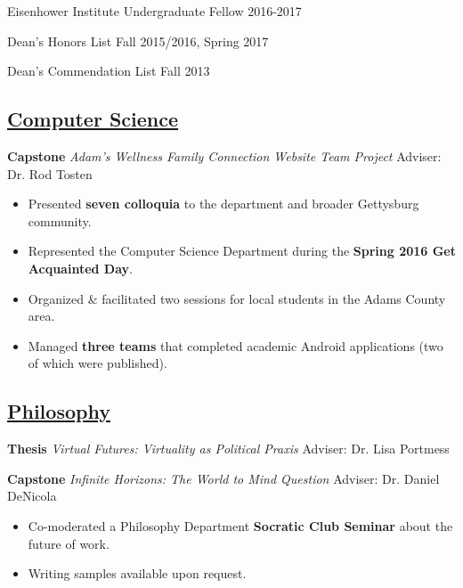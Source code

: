 \documentclass[11pt]{article}
\begin{document}
Eisenhower Institute Undergraduate Fellow 
\hfill
2016-2017

Dean's Honors List \hfill Fall 2015/2016, Spring 2017

Dean's Commendation List \hfill Fall 2013

\subsection*{\underline{Computer Science}}

\textbf{Capstone} \textit{Adam's Wellness Family Connection Website Team Project} \hfill Adviser: Dr. Rod Tosten

\begin{itemize}[noitemsep]
\item Presented \textbf{seven colloquia} to the department and broader Gettysburg community.
\item Represented the Computer Science Department during the \textbf{Spring 2016 Get Acquainted Day}. 
\item Organized \& facilitated two  sessions for local students in the Adams County area.
\item Managed \textbf{three teams} that completed academic Android applications (two of which were published).
\end{itemize}

\subsection*{\underline{Philosophy}}
\textbf{Thesis} \textit{Virtual Futures: Virtuality as Political Praxis} \hfill Adviser: Dr. Lisa Portmess

\textbf{Capstone} \textit{Infinite Horizons: The World to Mind Question} \hfill Adviser: Dr. Daniel DeNicola

\begin{itemize}[noitemsep]
\item Co-moderated a Philosophy Department \textbf{Socratic Club Seminar} about the future of work.
\item Writing samples available upon request.
\end{itemize}
\end{document}
